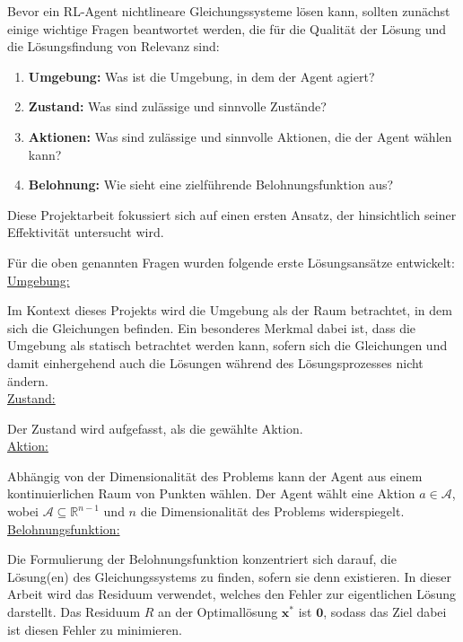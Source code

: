 \documentclass{article}
\theoremstyle{newline}
\begin{document}
\begin{onehalfspace}
Bevor ein RL-Agent nichtlineare Gleichungssysteme lösen kann, sollten zunächst einige wichtige Fragen beantwortet werden, die für die Qualität der Lösung und die Lösungsfindung von Relevanz sind:

\begin{enumerate}
	\item \textbf{Umgebung:} Was ist die Umgebung, in dem der Agent agiert?
	\item \textbf{Zustand:} Was sind zulässige und sinnvolle Zustände?
	\item \textbf{Aktionen:} Was sind zulässige und sinnvolle Aktionen, die der Agent wählen kann?
	\item \textbf{Belohnung:} Wie sieht eine zielführende Belohnungsfunktion aus?
\end{enumerate}

Diese Projektarbeit fokussiert sich auf einen ersten Ansatz, der hinsichtlich seiner Effektivität untersucht wird.

Für die oben genannten Fragen wurden folgende erste Lösungsansätze entwickelt:
\\

\underline{Umgebung:}
\smallskip

Im Kontext dieses Projekts wird die Umgebung als der Raum betrachtet, in dem sich die Gleichungen befinden. Ein besonderes Merkmal dabei ist, dass die Umgebung als statisch betrachtet werden kann, sofern sich die Gleichungen und damit einhergehend auch die Lösungen während des Lösungsprozesses nicht ändern.
\\

\underline{Zustand:}
\smallskip

Der Zustand wird aufgefasst, als die gewählte Aktion.
\\

\underline{Aktion:}
\smallskip

Abhängig von der Dimensionalität des Problems kann der Agent aus einem kontinuierlichen Raum von Punkten wählen. Der Agent wählt eine Aktion $a \in \mathcal{A}$, wobei $\mathcal{A} \subseteq \mathbb{R}^{n-1}$ und $n$ die Dimensionalität des Problems widerspiegelt.
\\
 
\underline{Belohnungsfunktion:}
\smallskip

Die Formulierung der Belohnungsfunktion konzentriert sich darauf, die Lösung(en) des Gleichungssystems zu finden, sofern sie denn existieren. In dieser Arbeit wird das Residuum verwendet, welches den Fehler zur eigentlichen Lösung darstellt. Das Residuum $R$ an der Optimallösung $\mathbf{x}^{\ast}$ ist $\mathbf{0}$, sodass das Ziel dabei ist diesen Fehler zu minimieren. 


\end{onehalfspace}
\end{document}
